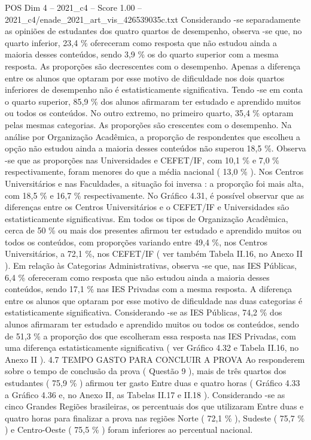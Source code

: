 \begin{textsample}{POS Dim 4 – 2021\_c4 – Score 1.00 – 2021\_c4/enade\_2021\_art\_vis\_426539035c.txt}
Considerando -se separadamente as opiniões de estudantes dos quatro quartos de desempenho, observa -se que, no quarto inferior, 23,4 \% ofereceram como resposta que não estudou ainda a maioria desses conteúdos, sendo 3,9 \% os do quarto superior com a mesma resposta.
As proporções são decrescentes com o desempenho.
Apenas a diferença entre os alunos que optaram por esse motivo de dificuldade nos dois quartos inferiores de desempenho não é estatisticamente significativa.
Tendo -se em conta o quarto superior, 85,9 \% dos alunos afirmaram ter estudado e aprendido muitos ou todos os conteúdos.
No outro extremo, no primeiro quarto, 35,4 \% optaram pelas mesmas categorias.
As proporções são crescentes com o desempenho.
Na análise por Organização Acadêmica, a proporção de respondentes que escolheu a opção não estudou ainda a maioria desses conteúdos não superou 18,5 \%.
Observa -se que as proporções nas Universidades e CEFET/IF, com 10,1 \% e 7,0 \% respectivamente, foram menores do que a média nacional ( 13,0 \% ).
Nos Centros Universitários e nas Faculdades, a situação foi inversa : a proporção foi mais alta, com 18,5 \% e 16,7 \% respectivamente.
No Gráfico 4.31, é possível observar que as diferenças entre os Centros Universitários e o CEFET/IF e Universidades são estatisticamente significativas.
Em todos os tipos de Organização Acadêmica, cerca de 50 \% ou mais dos presentes afirmou ter estudado e aprendido muitos ou todos os conteúdos, com proporções variando entre 49,4 \%, nos Centros Universitários, a 72,1 \%, nos CEFET/IF ( ver também Tabela II.16, no Anexo II ).
Em relação às Categorias Administrativas, observa -se que, nas IES Públicas, 6,4 \% ofereceram como resposta que não estudou ainda a maioria desses conteúdos, sendo 17,1 \% nas IES Privadas com a mesma resposta.
A diferença entre os alunos que optaram por esse motivo de dificuldade nas duas categorias é estatisticamente significativa.
Considerando -se as IES Públicas, 74,2 \% dos alunos afirmaram ter estudado e aprendido muitos ou todos os conteúdos, sendo de 51,3 \% a proporção dos que escolheram essa resposta nas IES Privadas, com uma diferença estatisticamente significativa ( ver Gráfico 4.32 e Tabela II.16, no Anexo II ). 4.7 TEMPO GASTO PARA CONCLUIR A PROVA Ao responderem sobre o tempo de conclusão da prova ( Questão 9 ), mais de três quartos dos estudantes ( 75,9 \% ) afirmou ter gasto Entre duas e quatro horas ( Gráfico 4.33 a Gráfico 4.36 e, no Anexo II, as Tabelas II.17 e II.18 ).
Considerando -se as cinco Grandes Regiões brasileiras, os percentuais dos que utilizaram Entre duas e quatro horas para finalizar a prova nas regiões Norte ( 72,1 \% ), Sudeste ( 75,7 \% ) e Centro-Oeste ( 75,5 \% ) foram inferiores ao percentual nacional.

\end{textsample}
